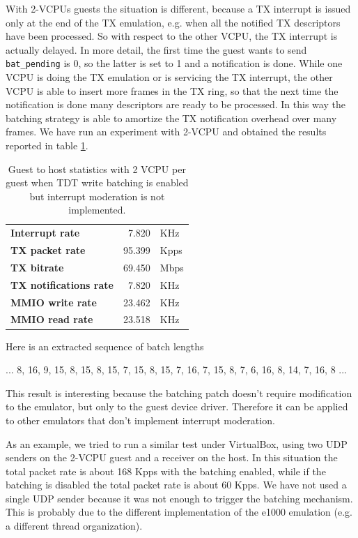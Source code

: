 \vspace{0.5cm}

With 2-VCPUs guests the situation is different, because a TX interrupt is issued only at the end of the TX emulation, e.g. when all the
notified TX descriptors have been processed. So with respect to the other VCPU, the TX interrupt is actually delayed.
In more detail, the first time the guest wants to send \texttt{bat\_pending} is 0, so the latter is set to 1 and a notification is done.
While one VCPU is doing the TX emulation or is servicing the TX interrupt, the other VCPU is able to insert more frames in the TX ring,
so that the next time the notification is done many descriptors are ready to be processed. In this way the batching strategy is able
to amortize the TX notification overhead over many frames. We have run an experiment with 2-VCPU and obtained the results reported in
table \ref{tab:e1000-bat-tx-g2h2vcpu}.

\begin{table}
\begin{center}
\begin{tabular}{lrl}
\toprule
\textbf{Interrupt rate} & 7.820 & KHz\\
\textbf{TX packet rate} & 95.399 & Kpps\\
\textbf{TX bitrate} & 69.450 & Mbps\\
\textbf{TX notifications rate} & 7.820 & KHz\\
\textbf{MMIO write rate} & 23.462 & KHz\\
\textbf{MMIO read rate} & 23.518 & KHz\\
\bottomrule
\end{tabular}
\end{center}
\caption{Guest to host statistics with 2 VCPU per guest when TDT write batching is enabled but interrupt moderation is not implemented.}
\label{tab:e1000-bat-tx-g2h2vcpu}
\end{table}

Here is an extracted sequence of batch lengths

\begin{center}
... 8, 16, 9, 15, 8, 15, 8, 15, 7, 15, 8, 15, 7, 16, 7, 15, 8, 7, 6, 16, 8, 14, 7, 16, 8 ...
\end{center}

\vspace{0.5cm}

This result is interesting because the batching patch doesn't require modification to the emulator, but only to the guest device driver.
Therefore it can be applied to other emulators that don't implement interrupt moderation.

As an example, we tried to run a similar test under VirtualBox, using two UDP senders on the 2-VCPU
guest and a receiver on the host. In this situation the total packet rate is about 168 Kpps with the batching enabled, while if
the batching is disabled the total packet rate is about 60 Kpps. We have not used a single UDP sender because it was not enough to trigger
the batching mechanism. This is probably due to the different implementation of the e1000 emulation (e.g. a different thread organization).

